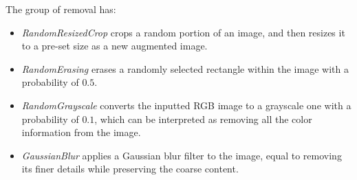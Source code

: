 \documentclass[letterpaper]{article} %
\begin{document}
The group of removal has:
\begin{itemize}
    \item \textit{RandomResizedCrop} crops a random portion of an image, and then resizes it to a pre-set size as a new augmented image. 
    

    \item \textit{RandomErasing} erases a randomly selected rectangle within the image with a probability of $0.5$. 

    \item \textit{RandomGrayscale} converts the inputted RGB image to a grayscale one with a probability of $0.1$, which can be interpreted as removing all the color information from the image.

    \item \textit{GaussianBlur} applies a Gaussian blur filter to the image, equal to removing its finer details while preserving the coarse content.
    
\end{itemize}
\end{document}
